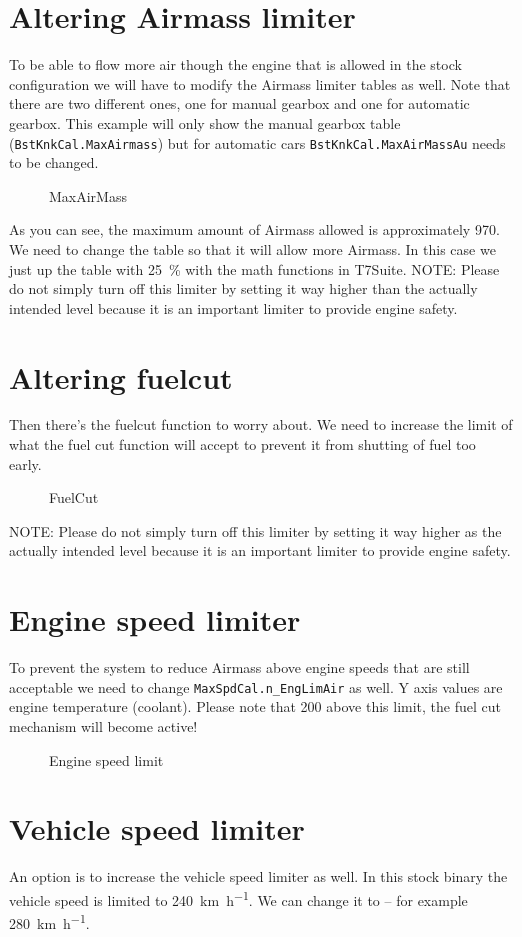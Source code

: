\documentclass[11pt,a4paper]{book}
\newcommand{\Mfig}[1]{%
\begin{figure}
    \centering
    \missingfigure{#1}
    \caption{#1}
\end{figure}}
\begin{document}
\section{Altering Airmass limiter}
To be able to flow more air though the engine that is allowed in the stock
configuration we will have to modify the Airmass limiter tables as well. Note
that there are two different ones, one for manual gearbox and one for automatic
gearbox. This example will only show the manual gearbox table
(\texttt{BstKnkCal.MaxAirmass}) but for automatic cars
\texttt{BstKnkCal.MaxAirMassAu} needs to be
changed.

\Mfig{MaxAirMass}

As you can see, the maximum amount of Airmass allowed is approximately
\SI{970}{\mgc}. We need to change the table so that it will allow more Airmass.
In this case we just up the table with \SI{25}{\percent} with the math functions
in T7Suite. NOTE: Please do not simply turn off this limiter by setting it way
higher than the actually intended level because it is an important limiter to
provide engine safety.

\section{Altering fuelcut}
Then there’s the fuelcut function to worry about. We need to increase the limit
of what the fuel cut function will accept to prevent it from shutting of fuel
too early.
\Mfig{FuelCut}
NOTE: Please do not simply turn off this limiter by setting it way
higher as the actually intended level because it is an important limiter to
provide engine safety.


\section{Engine speed limiter}
To prevent the system to reduce Airmass above engine speeds that are still acceptable we need to
change \texttt{MaxSpdCal.n\_EngLimAir} as well. Y axis values are engine temperature (coolant). Please note
that \SI{200}{\rpm} above this limit, the fuel cut mechanism will become active!
\Mfig{Engine speed limit}

\section{Vehicle speed limiter}
An option is to increase the vehicle speed limiter as well. In this stock binary the vehicle speed is
limited to \SI{240}{\kilo\meter\per\hour}. We can change it to – for example
\SI{280}{\kilo\meter\per\hour}.
\end{document}
